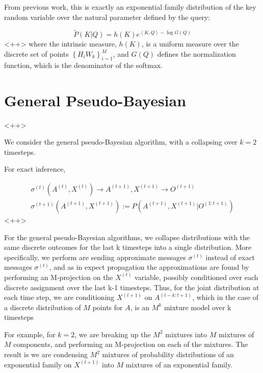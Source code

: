 \documentclass[a4paper]{article}
\begin{document}
From previous work, this is exactly an exponential family distribution of the key random variable over the natural parameter defined by the query:

\begin{equation}
  \tilde{P} \left( K \vert Q \right) = h(K) e^{ \left< K , Q \right> - \log G( Q) }
  \label{<++>}
\end{equation}<++>
where the intrinsic measure, $h(K)$, is a uniform measure over the discrete set of points $\left\{ H_i W_k \right\}_{i=1}^M$, and $ G(Q) $ defines the normalization function, which is the denominator of the softmax.

\section{General Pseudo-Bayesian}<++>

We consider the general pseudo-Bayesian algorithm, with a collapsing over $k=2$ timesteps.

For exact inference,

\begin{equation}
  \begin{split}
    \sigma^{(t)} \left( A^{(t)}, X^{(t)} \right) \rightarrow A^{(t+1)},X^{(t+1)} \rightarrow O^{(t+1)} \\
    \sigma^{(t+1)} \left( A^{(t+1)}, X^{(t+1)} \right) := P \left( A^{(t+1)}, X^{(t+1)} \vert O^{(1:t+1)} \right)
  \end{split}
  \label{<++>}
\end{equation}<++>

For the general pseudo-Bayesian algorithms, we collapse distributions with the same discrete outcomes for the last k timesteps into a single distribution. 
More specifically, we perform are sending approximate messages $\sigma^{(t)}$ instead of exact messages $\sigma^{(t)}$, and as in expect propagation the approximations are found by performing an M-projection on the $X^{(t)}$ variable, possibly conditioned over each discrete assignment over the last k-1 timesteps.  
Thus, for the joint distribution at each time step, we are conditioning $X^{(t+1)}$ on $A^{(t-k:t+1)}$, which in the case of a discrete distribution of $M$ points for $A$, is an $M^k$ mixture model over k timesteps

For example, for $k = 2$, we are breaking up the $M^2$ mixtures into $M$ mixtures of $M$ components, and performing an M-projection on each of the mixtures.  
The result is we are condensing $M^2$ mixtures of probability distributions of an exponential family on $X^{(t+1)}$ into $M$ mixtures of an exponential family.
\end{document}
